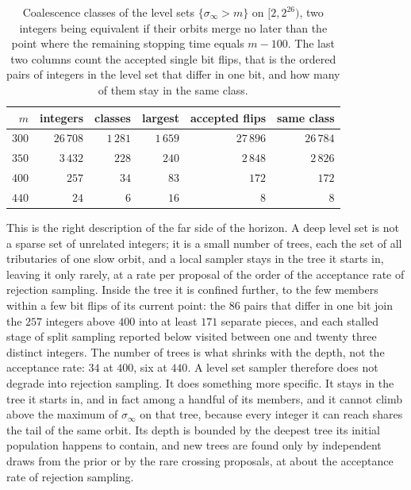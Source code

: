 \begin{table}[t]
\centering\small
\caption{Coalescence classes of the level sets $\{\sigma_\infty>m\}$ on
$[2,2^{26})$, two integers being equivalent if their orbits merge no later than the point where the remaining stopping time equals $m-100$. The last two columns count the accepted single bit flips, that is the ordered pairs of integers in the level set that differ in one bit, and how many of them stay in the same class.}
\label{tab:ch10b:clusters}
\begin{tabular}{@{}rrrrrr@{}}
\toprule
$m$ & integers & classes & largest & accepted flips & same class \\
\midrule
$300$ & $26\,708$ & $1\,281$ & $1\,659$ & $27\,896$ & $26\,784$ \\
$350$ & $3\,432$ & $228$ & $240$ & $2\,848$ & $2\,826$ \\
$400$ & $257$ & $34$ & $83$ & $172$ & $172$ \\
$440$ & $24$ & $6$ & $16$ & $8$ & $8$ \\
\bottomrule
\end{tabular}
\end{table}

This is the right description of the far side of the horizon. A deep level set
is not a sparse set of unrelated integers; it is a small number of trees, each
the set of all tributaries of one slow orbit, and a local sampler stays in the tree it starts in, leaving it only rarely, at a rate per proposal of the order of the acceptance rate of rejection sampling. Inside the tree it is confined further, to the few members within a few bit flips of its current point: the $86$ pairs that differ in one bit join the $257$ integers above $400$ into at least $171$ separate pieces, and each stalled stage of split sampling reported below visited between one and twenty three distinct integers. The number of trees is what shrinks with
the depth, not the acceptance rate: $34$ at $400$, six at $440$. A level set
sampler therefore does not degrade into rejection sampling. It does something
more specific. It stays in the tree it starts in, and in fact among a handful of its members, and it
cannot climb above the maximum of $\sigma_\infty$ on that tree, because every
integer it can reach shares the tail of the same orbit. Its depth is bounded
by the deepest tree its initial population happens to contain, and new trees
are found only by independent draws from the prior or by the rare crossing proposals, at about the acceptance rate of rejection sampling.

